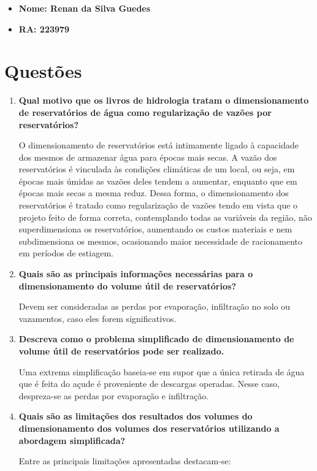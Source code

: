 \documentclass[a4paper, 12pt]{article}
\newcommand{\tbf}[1]{\textbf{#1}}
\begin{document}
	\begin{itemize}
		\item\tbf{Nome: Renan da Silva Guedes}
		\item\tbf{RA: 223979}
	\end{itemize}

	\section{Questões}
	\begin{enumerate}
		\item\tbf{Qual motivo que os livros de hidrologia tratam o dimensionamento de reservatórios de água como regularização de vazões por reservatórios?}
		
		O dimensionamento de reservatórios está intimamente ligado à capacidade dos mesmos de armazenar água para épocas mais secas. A vazão dos reservatórios é vinculada às condições climáticas de um local, ou seja, em épocas mais úmidas as vazões deles tendem a aumentar, enquanto que em épocas mais secas a mesma reduz. Dessa forma, o dimensionamento dos reservatórios é tratado como regularização de vazões tendo em vista que o projeto feito de forma correta, contemplando todas as variáveis da região, não superdimensiona os reservatórios, aumentando os custos materiais e nem subdimensiona os mesmos, ocasionando maior necessidade de racionamento em períodos de estiagem.
		
		\item\tbf{Quais são as principais informações necessárias para o dimensionamento do volume útil de reservatórios?}
		
		Devem ser consideradas as perdas por evaporação, infiltração no solo ou vazamentos, caso eles forem significativos.
		
		\item\tbf{Descreva como o problema simplificado de dimensionamento de volume útil de reservatórios pode ser realizado.}
		
		Uma extrema simplificação baseia-se em supor que a única retirada de água que é feita do açude é proveniente de descargas operadas. Nesse caso, despreza-se as perdas por evaporação e infiltração.
		
		\item\tbf{Quais são as limitações dos resultados dos volumes do dimensionamento dos volumes dos reservatórios utilizando a abordagem simplificada?} 
		
		Entre as principais limitações apresentadas destacam-se:
		

\end{enumerate}
\end{document}
